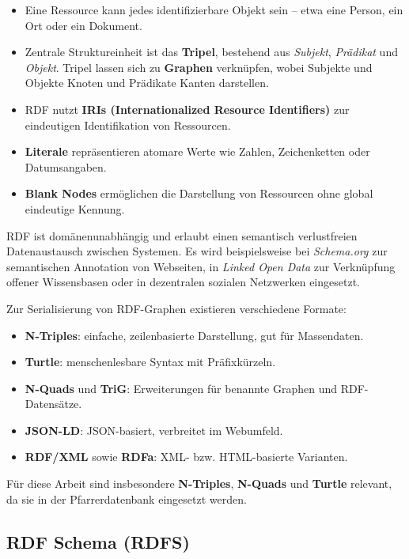 \begin{itemize}
    \item Eine Ressource kann jedes identifizierbare Objekt sein – etwa eine Person, ein Ort oder ein Dokument.  
    \item Zentrale Struktureinheit ist das \textbf{Tripel}, bestehend aus \textit{Subjekt}, \textit{Prädikat} und \textit{Objekt}. Tripel lassen sich zu \textbf{Graphen} verknüpfen, wobei Subjekte und Objekte Knoten und Prädikate Kanten darstellen.  
    \item RDF nutzt \textbf{IRIs (Internationalized Resource Identifiers)} zur eindeutigen Identifikation von Ressourcen.  
    \item \textbf{Literale} repräsentieren atomare Werte wie Zahlen, Zeichenketten oder Datumsangaben.  
    \item \textbf{Blank Nodes} ermöglichen die Darstellung von Ressourcen ohne global eindeutige Kennung.  
\end{itemize}

RDF ist domänenunabhängig und erlaubt einen semantisch verlustfreien Datenaustausch zwischen Systemen. Es wird beispielsweise bei \textit{Schema.org} zur semantischen Annotation von Webseiten, in \textit{Linked Open Data} zur Verknüpfung offener Wissensbasen oder in dezentralen sozialen Netzwerken eingesetzt.  

Zur Serialisierung von RDF-Graphen existieren verschiedene Formate:  

\begin{itemize}
    \item \textbf{N-Triples}: einfache, zeilenbasierte Darstellung, gut für Massendaten.  
    \item \textbf{Turtle}: menschenlesbare Syntax mit Präfixkürzeln.  
    \item \textbf{N-Quads} und \textbf{TriG}: Erweiterungen für benannte Graphen und RDF-Datensätze.  
    \item \textbf{JSON-LD}: JSON-basiert, verbreitet im Webumfeld.  
    \item \textbf{RDF/XML} sowie \textbf{RDFa}: XML- bzw. HTML-basierte Varianten.  
\end{itemize}

Für diese Arbeit sind insbesondere \textbf{N-Triples}, \textbf{N-Quads} und \textbf{Turtle} relevant, da sie in der Pfarrerdatenbank eingesetzt werden.  

\subsection{RDF Schema (RDFS)}

